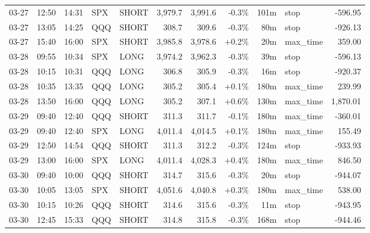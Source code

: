 \documentclass[11pt,a4paper,twoside]{article}
\begin{document}
\begin{center}
\begin{longtable}{>{\color{txtmain}}l l l l l r r r r >{\color{txtmain}}l r}
03-27 & 12:50 & 14:31 & SPX & SHORT & 3,979.7 & 3,991.6 & \textcolor{lossred}{-0.3\%} & 101m & stop & \textcolor{lossred}{-596.95} \\
03-27 & 13:05 & 14:25 & QQQ & SHORT & 308.7 & 309.6 & \textcolor{lossred}{-0.3\%} & 80m & stop & \textcolor{lossred}{-926.13} \\
03-27 & 15:40 & 16:00 & SPX & SHORT & 3,985.8 & 3,978.6 & \textcolor{wingreen}{+0.2\%} & 20m & max\_time & \textcolor{wingreen}{359.00} \\
03-28 & 09:55 & 10:34 & SPX & LONG & 3,974.2 & 3,962.3 & \textcolor{lossred}{-0.3\%} & 39m & stop & \textcolor{lossred}{-596.13} \\
03-28 & 10:15 & 10:31 & QQQ & LONG & 306.8 & 305.9 & \textcolor{lossred}{-0.3\%} & 16m & stop & \textcolor{lossred}{-920.37} \\
03-28 & 10:35 & 13:35 & QQQ & LONG & 305.2 & 305.4 & \textcolor{wingreen}{+0.1\%} & 180m & max\_time & \textcolor{wingreen}{239.99} \\
03-28 & 13:50 & 16:00 & QQQ & LONG & 305.2 & 307.1 & \textcolor{wingreen}{+0.6\%} & 130m & max\_time & \textcolor{wingreen}{1,870.01} \\
03-29 & 09:40 & 12:40 & QQQ & SHORT & 311.3 & 311.7 & \textcolor{lossred}{-0.1\%} & 180m & max\_time & \textcolor{lossred}{-360.01} \\
03-29 & 09:40 & 12:40 & SPX & LONG & 4,011.4 & 4,014.5 & \textcolor{wingreen}{+0.1\%} & 180m & max\_time & \textcolor{wingreen}{155.49} \\
03-29 & 12:50 & 14:54 & QQQ & SHORT & 311.3 & 312.2 & \textcolor{lossred}{-0.3\%} & 124m & stop & \textcolor{lossred}{-933.93} \\
03-29 & 13:00 & 16:00 & SPX & LONG & 4,011.4 & 4,028.3 & \textcolor{wingreen}{+0.4\%} & 180m & max\_time & \textcolor{wingreen}{846.50} \\
03-30 & 09:40 & 10:00 & QQQ & SHORT & 314.7 & 315.6 & \textcolor{lossred}{-0.3\%} & 20m & stop & \textcolor{lossred}{-944.07} \\
03-30 & 10:05 & 13:05 & SPX & SHORT & 4,051.6 & 4,040.8 & \textcolor{wingreen}{+0.3\%} & 180m & max\_time & \textcolor{wingreen}{538.00} \\
03-30 & 10:15 & 10:26 & QQQ & SHORT & 314.6 & 315.6 & \textcolor{lossred}{-0.3\%} & 11m & stop & \textcolor{lossred}{-943.95} \\
03-30 & 12:45 & 15:33 & QQQ & SHORT & 314.8 & 315.8 & \textcolor{lossred}{-0.3\%} & 168m & stop & \textcolor{lossred}{-944.46} \\

\end{longtable}
\end{center}
\end{document}
